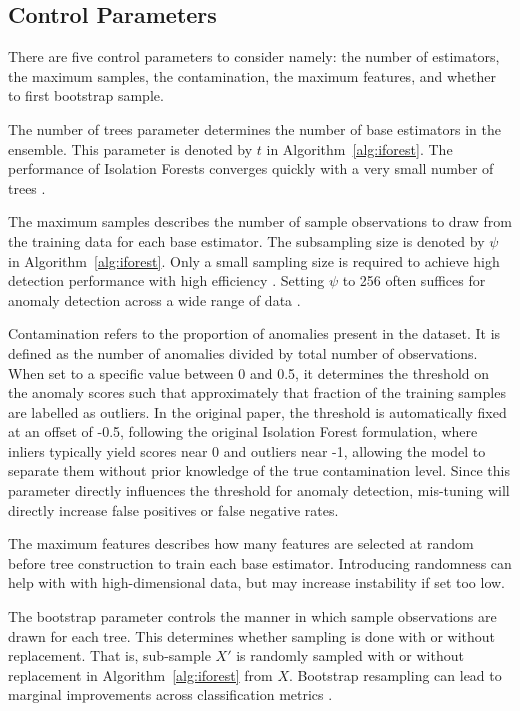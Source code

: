 \documentclass[10pt, conference]{IEEEtran}
\begin{document}


\subsection{Control Parameters}
There are five control parameters to consider namely: the number of estimators, the maximum samples, the contamination, the maximum features, and whether to first bootstrap sample.

The number of trees parameter determines the number of base estimators in the ensemble. This parameter is denoted by $t$ in Algorithm~\ref{alg:iforest}. The performance of Isolation Forests converges quickly with a very small number of trees \cite{iforest}.


The maximum samples describes the number of sample observations to draw from the training data for each base estimator. The subsampling size is denoted by $\psi$ in Algorithm~\ref{alg:iforest}. Only a small sampling size is required to achieve high detection performance with high efficiency \cite{iforest}. Setting $\psi$ to 256 often suffices for anomaly detection across a wide range of data \cite{iforest2}.

Contamination refers to the proportion of anomalies present in the dataset. It is defined as the number of anomalies divided by total number of observations. When set to a specific value between 0 and 0.5, it determines the threshold on the anomaly scores such that approximately that fraction of the training samples are labelled as outliers. In the original paper, the threshold is automatically fixed at an offset of -0.5, following the original Isolation Forest formulation, where inliers typically yield scores near 0 and outliers near -1, allowing the model to separate them without prior knowledge of the true contamination level. Since this parameter directly influences the threshold for anomaly detection, mis-tuning will directly increase false positives or false negative rates.

The maximum features describes how many features are selected at random before tree construction to train each base estimator. Introducing randomness can help with with high-dimensional data, but may increase instability if set too low.

The bootstrap parameter controls the manner in which sample observations are drawn for each tree. This determines whether sampling is done with or without replacement. That is, sub-sample $X'$ is randomly sampled with or without replacement in Algorithm~\ref{alg:iforest} from $X$. Bootstrap resampling can lead to marginal improvements across classification metrics \cite{Choi2025Impact}.
\end{document}
